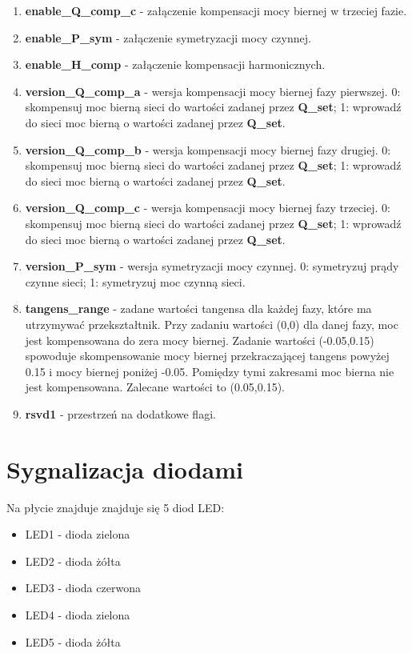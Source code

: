 \documentclass[12pt,a4paper]{article}
\begin{document}
\begin{enumerate}
	\item \textbf{enable\_Q\_comp\_c} - załączenie kompensacji mocy biernej w trzeciej fazie.
	
	\item \textbf{enable\_P\_sym} - załączenie symetryzacji mocy czynnej.
	
	\item \textbf{enable\_H\_comp} - załączenie kompensacji harmonicznych.
	
	\item \textbf{version\_Q\_comp\_a} - wersja kompensacji mocy biernej fazy pierwszej. 0: skompensuj moc bierną sieci do wartości zadanej przez \textbf{Q\_set}; 1: wprowadź do sieci moc bierną o wartości zadanej przez \textbf{Q\_set}.
	
	\item \textbf{version\_Q\_comp\_b} - wersja kompensacji mocy biernej fazy drugiej. 0: skompensuj moc bierną sieci do wartości zadanej przez \textbf{Q\_set}; 1: wprowadź do sieci moc bierną o wartości zadanej przez \textbf{Q\_set}.
			
	\item \textbf{version\_Q\_comp\_c} - wersja kompensacji mocy biernej fazy trzeciej. 0: skompensuj moc bierną sieci do wartości zadanej przez \textbf{Q\_set}; 1: wprowadź do sieci moc bierną o wartości zadanej przez \textbf{Q\_set}.
			
	\item \textbf{version\_P\_sym} -  wersja symetryzacji mocy czynnej. 0: symetryzuj prądy czynne sieci; 1: symetryzuj moc czynną sieci.
				
	\item \textbf{tangens\_range} - zadane wartości tangensa dla każdej fazy, które ma utrzymywać przekształtnik. Przy zadaniu wartości (0,0) dla danej fazy, moc jest kompensowana do zera mocy biernej. Zadanie wartości (-0.05,0.15) spowoduje skompensowanie mocy biernej przekraczającej tangens powyżej 0.15 i mocy biernej poniżej -0.05. Pomiędzy tymi zakresami moc bierna nie jest kompensowana. Zalecane wartości to (0.05,0.15).
	
	\item \textbf{rsvd1} - przestrzeń na dodatkowe flagi.
	
\end{enumerate}

\section{Sygnalizacja diodami}
Na płycie znajduje znajduje się 5 diod LED:
\begin{itemize}
	\item LED1 - dioda zielona
	\item LED2 - dioda żółta
	\item LED3 - dioda czerwona
	\item LED4 - dioda zielona
	\item LED5 - dioda żółta
\end{itemize}
\end{document}
